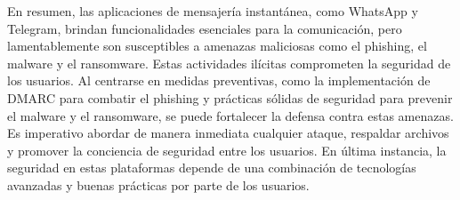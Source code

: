 \documentclass[letterpaper, 12pt]{article}
\begin{document}
En resumen, las aplicaciones de mensajería instantánea,
como WhatsApp y Telegram, brindan funcionalidades
esenciales para la comunicación, pero lamentablemente son
susceptibles a amenazas maliciosas como el phishing, el
malware y el ransomware. Estas actividades ilícitas
comprometen la seguridad de los usuarios. Al centrarse en
medidas preventivas, como la implementación de DMARC para
combatir el phishing y prácticas sólidas de seguridad para
prevenir el malware y el ransomware, se puede fortalecer la
defensa contra estas amenazas. Es imperativo abordar de
manera inmediata cualquier ataque, respaldar archivos y
promover la conciencia de seguridad entre los usuarios. En
última instancia, la seguridad en estas plataformas depende
de una combinación de tecnologías avanzadas y buenas
prácticas por parte de los usuarios.


\end{document}
